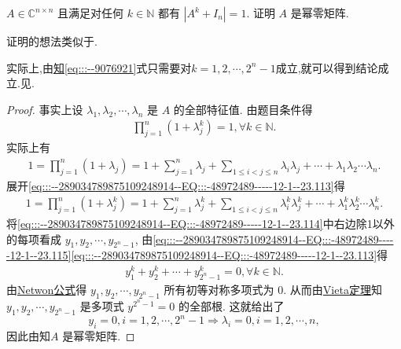 \documentclass[../../main.tex]{subfiles}%
\begin{document}
\begin{example}\label{example:例题238--78971}
$A \in \mathbb{C}^{n \times n}$ 且满足对任何 $k \in \mathbb{N}$ 都有 $|A^k + I_n| = 1$. 证明 $A$ 是幂零矩阵.
\end{example}
\begin{note}
证明的想法类似于. 
\end{note}
\begin{remark}
实际上,由\hyperref[theorem:Netwon公式]知\eqref{eq:::--9076921}式只需要对$k=1,2,\cdots,2^n-1$成立,就可以得到结论成立.见.
\end{remark}
\begin{proof}
事实上设 $\lambda_1, \lambda_2, \cdots, \lambda_n$ 是 $A$ 的全部特征值. 由题目条件得
\begin{align}\label{eq:::--289034789875109248914--EQ:::-48972489-----12-1--23.113}
\prod_{j=1}^n (1 + \lambda_j^k) = 1, \forall k \in \mathbb{N}.
\end{align}
实际上有
\begin{align}\label{eq:::--289034789875109248914--EQ:::-48972489-----12-1--23.114}
1=\prod_{j=1}^n (1 + \lambda_j) = 1 + \sum\limits_{j=1}^n \lambda_j + \sum\limits_{1 \leqslant i < j \leqslant n} \lambda_i \lambda_j + \cdots + \lambda_1 \lambda_2 \cdots \lambda_n.
\end{align}
展开\eqref{eq:::--289034789875109248914--EQ:::-48972489-----12-1--23.113}得
\begin{align}\label{eq:::--289034789875109248914--EQ:::-48972489-----12-1--23.115}
1=\prod_{j=1}^n (1 + \lambda_j^k) = 1 + \sum_{j=1}^n \lambda_j^k + \sum_{1 \leqslant i < j \leqslant n} \lambda_i^k \lambda_j^k + \cdots + \lambda_1^k \lambda_2^k \cdots \lambda_n^k.
\end{align}
将\eqref{eq:::--289034789875109248914--EQ:::-48972489-----12-1--23.114}中右边除1以外的每项看成 $y_1, y_2, \cdots, y_{2^n - 1}$, 由\eqref{eq:::--289034789875109248914--EQ:::-48972489-----12-1--23.115}\eqref{eq:::--289034789875109248914--EQ:::-48972489-----12-1--23.113}得
\begin{align}
y_1^k + y_2^k + \cdots + y_{2^n - 1}^k = 0, \forall k \in \mathbb{N}.\label{eq:::--9076921}
\end{align}
由\hyperref[theorem:Netwon公式]{Netwon公式}得 $y_1, y_2, \cdots, y_{2^n - 1}$ 所有初等对称多项式为 $0$. 从而由\hyperref[theorem:Vieta定理]{Vieta定理}知 $y_1, y_2, \cdots, y_{2^n - 1}$ 是多项式 $y^{2^n - 1} = 0$ 的全部根. 这就给出了
$$y_i = 0, i = 1, 2, \cdots, 2^n - 1 \Longrightarrow \lambda_i = 0, i = 1, 2, \cdots, n,$$
因此由知$A$ 是幂零矩阵.
\end{proof}
\end{document}
